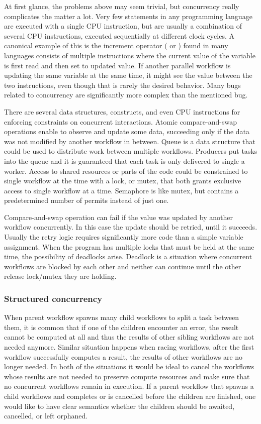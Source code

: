 At first glance, the problems above may seem trivial, but concurrency really complicates the matter a lot. Very few statements in any programming language are executed with a single CPU instruction, but are usually a combination of several CPU instructions, executed sequentially at different clock cycles. A canonical example of this is the increment operator (\inlinecode{++} or \inlinecode{+=}) found in many languages consists of multiple instructions where the current value of the variable is first read and then set to updated value. If another parallel workflow is updating the same variable at the same time, it might see the value between the two instructions, even though that is rarely the desired behavior. Many bugs related to concurrency are significantly more complex than the mentioned bug.

There are several data structures, constructs, and even CPU instructions for enforcing constraints on concurrent interactions. Atomic compare-and-swap operations enable to observe and update some data, succeeding only if the data was not modified by another workflow in between. Queue is a data structure that could be used to distribute work between multiple workflows. Producers put tasks into the queue and it is guaranteed that each task is only delivered to single a worker. Access to shared resources or parts of the code could be constrained to single workflow at the time with a lock, or mutex, that both grants exclusive access to single workflow at a time. Semaphore is like mutex, but contains a predetermined number of permits instead of just one. 

Compare-and-swap operation can fail if the value was updated by another workflow concurrently. In this case the update should be retried, until it succeeds. Usually the retry logic requires significantly more code than a simple variable assignment. When the program has multiple locks that must be held at the same time, the possibility of deadlocks arise. Deadlock is a situation where concurrent workflows are blocked by each other and neither can continue until the other release lock/mutex they are holding.


\subsubsection{Structured concurrency}
When parent workflow spawns many child workflows to split a task between them, it is common that if one of the children encounter an error, the result cannot be computed at all and thus the results of other sibling workflows are not needed anymore. Similar situation happens when racing workflows, after the first workflow successfully computes a result, the results of other workflows are no longer needed. In both of the situations it would be ideal to cancel the workflows whose results are not needed to preserve compute resources and make sure that no concurrent workflows remain in execution. If a parent workflow that spawns a child workflows and completes or is cancelled before the children are finished, one would like to have clear semantics whether the children should be awaited, cancelled, or left orphaned.


